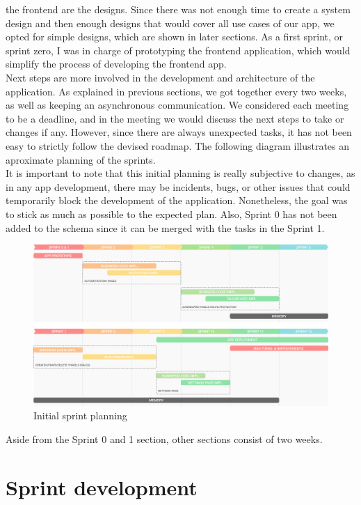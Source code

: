 \documentclass[../memory.tex]{subfiles}
\begin{document}
the frontend are the designs. Since there was not enough time to create a system
design and then enough designs that would cover all use cases of our app, we
opted for simple designs, which are shown in later sections. As a first sprint,
or sprint zero, I was in charge of prototyping the frontend application, which
would simplify the process of developing the frontend app.
\\[8pt]
Next steps are more involved in the development and architecture of the
application. As explained in previous sections, we got together every two weeks,
as well as keeping an asynchronous communication. We considered each meeting to
be a deadline, and in the meeting we would discuss the next steps to take or
changes if any. However, since there are always unexpected tasks, it has not
been easy to strictly follow the devised roadmap. The following diagram
illustrates an aproximate planning of the sprints.
\\
It is important to note that this initial planning is really subjective to
changes, as in any app development, there may be incidents, bugs, or other
issues that could temporarily block the development of the application.
Nonetheless, the goal was to stick as much as possible to the expected plan.
Also, Sprint 0 has not been added to the schema since it can be merged with the
tasks in the Sprint 1.
\begin{figure}[H]
	\centering
	\includegraphics[width=\textwidth]{./assets/roadmap.png}
	\caption{Initial sprint planning}
\end{figure}
Aside from the Sprint 0 and 1 section, other sections consist of two weeks.
\section{Sprint development}
\end{document}
